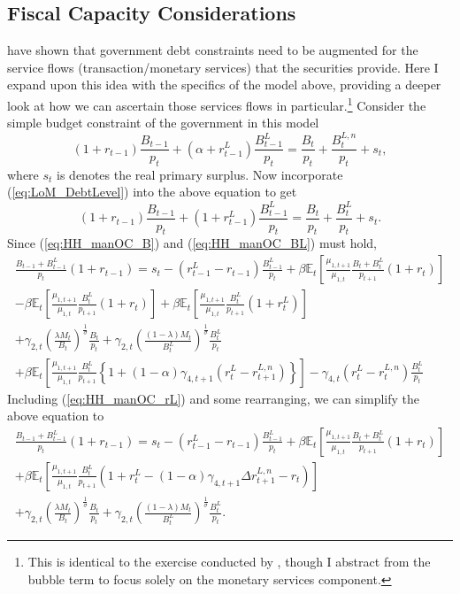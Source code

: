 \documentclass[11pt,a4paper,margin=1.5in]{article}
\begin{document}
\subsection{Fiscal Capacity Considerations}
\label{subsec:Theory_Capacity}
\citet*{Brunnermeier-Merkel-Sannikov:2022} have shown that government debt constraints need to be augmented for the service flows (transaction/monetary services) that the securities provide.
Here I expand upon this idea with the specifics of the model above, providing a deeper look at how we can ascertain those services flows in particular.\footnote{
	This is identical to the exercise conducted by \citet{Brunnermeier-Merkel-Sannikov:2020}, though I abstract from the bubble term to focus solely on the monetary services component.}
Consider the simple budget constraint of the government in this model
\begin{equation}
	(1+r_{t-1})\frac{B_{t-1}}{p_t} + (\alpha + r^L_{t-1})\frac{B^L_{t-1}}{p_t} = \frac{B_t}{p_t} + \frac{B^{L,n}_t}{p_t} + s_t,
\end{equation}
where $s_t$ is denotes the real primary surplus. 
Now incorporate (\ref{eq:LoM_DebtLevel}) into the above equation to get
\begin{equation}
	(1+r_{t-1})\frac{B_{t-1}}{p_t} + (1 + r^L_{t-1})\frac{B^L_{t-1}}{p_t} = \frac{B_t}{p_t} + \frac{B^{L}_t}{p_t} + s_t.
\end{equation}
Since (\ref{eq:HH_manOC_B}) and (\ref{eq:HH_manOC_BL}) must hold,
\begin{multline}
	\frac{B_{t-1} + B^L_{t-1}}{p_t}(1+r_{t-1})= s_t  - (r_{t-1}^L - r_{t-1})\frac{B^L_{t-1}}{p_t} + \beta\mathbb{E}_t\left[\frac{\mu_{1,t+1}}{\mu_{1,t}} \frac{B_{t} +B^L_{t}}{p_{t+1}}(1+r_{t})\right] \\ 
		- \beta\mathbb{E}_t\left[\frac{\mu_{1,t+1}}{\mu_{1,t}} \frac{B^L_{t}}{p_{t+1}}(1+r_{t})\right] + \beta\mathbb{E}_t\left[\frac{\mu_{1,t+1}}{\mu_{1,t}} \frac{B^L_{t}}{p_{t+1}}(1+r^L_{t})\right] \\
		+  \gamma_{2,t}\left(\frac{\lambda M_t}{B_t}\right)^\frac{1}{\sigma}\frac{B_t}{p_t} +\gamma_{2,t}\left(\frac{(1-\lambda) M_t}{B^L_t}\right)^\frac{1}{\sigma}\frac{B^L_t}{p_t} \\
		+\beta\mathbb{E}_t\left[\frac{\mu_{1,t+1}}{\mu_{1,t}} \frac{B^L_t}{p_{t+1}}\left\{1+  (1-\alpha)\gamma_{4,t+1}\left(r^L_t - r^{L,n}_{t+1}\right)\right\}\right] - \gamma_{4,t}\left(r^L_t - r^{L,n}_t\right)\frac{B^L_t}{p_t}
\end{multline}
Including (\ref{eq:HH_manOC_rL}) and some rearranging, we can simplify the above equation to
\begin{multline}
	\frac{B_{t-1} + B^L_{t-1}}{p_t}(1+r_{t-1})= s_t - (r_{t-1}^L - r_{t-1})\frac{B^L_{t-1}}{p_t} + \beta\mathbb{E}_t\left[\frac{\mu_{1,t+1}}{\mu_{1,t}} \frac{B_{t} +B^L_{t}}{p_{t+1}}(1+r_{t})\right] \\ 
		+ \beta\mathbb{E}_t\left[\frac{\mu_{1,t+1}}{\mu_{1,t}} \frac{B^L_{t}}{p_{t+1}}(1+r^L_{t} - (1-\alpha)\gamma_{4,t+1}\Delta r^{L,n}_{t+1} - r_t)\right]  \\
		+  \gamma_{2,t}\left(\frac{\lambda M_t}{B_t}\right)^\frac{1}{\sigma}\frac{B_t}{p_t} +\gamma_{2,t}\left(\frac{(1-\lambda) M_t}{B^L_t}\right)^\frac{1}{\sigma}\frac{B^L_t}{p_t}.
\end{multline}
\end{document}
